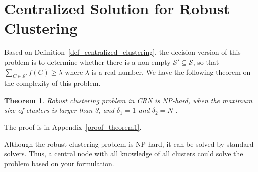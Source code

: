 \documentclass[10pt,journal,compsoc]{IEEEtran}
\theoremstyle{mytheoremstyle}
\newtheorem{theorem}{Theorem}[section]
\theoremstyle{mytheoremstyle}
\theoremstyle{mytheoremstyle}
\begin{document}
\section{Centralized Solution for Robust Clustering}
\label{centralized_solution}

Based on Definition~\ref{def_centralized_clustering}, the decision version of this problem is to determine whether there is a non-empty $\mathcal{S}'\subseteq \mathcal{S}$, so that $\sum_{C\in \mathcal{S}'} f(C) \geqslant \lambda$ where $\lambda$ is a real number.
We have the following theorem on the complexity of this problem.

\begin{theorem}
\label{theorem1}
Robust clustering problem in CRN is NP-hard, when the maximum size of clusters is larger than 3, and $\delta_1=1$ and $\delta_2 = N$ .
\end{theorem}
The proof is in Appendix~\ref{proof_theorem1}.

Although the robust clustering problem is NP-hard, it can be solved by standard solvers. 
Thus, a central node with all knowledge of all clusters could solve the problem based on your formulation. 



%


\end{document}
